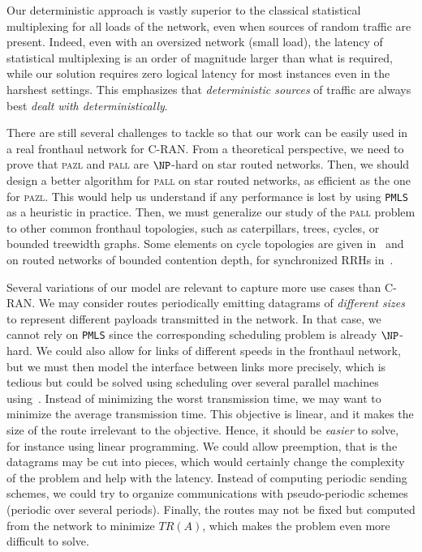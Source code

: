 \documentclass[a4paper,10pt]{journal}
\newcommand\PMLS{\texttt{PMLS}\xspace}
\newcommand\pazl{\textsc{pazl}\xspace}
\newcommand\pall{\textsc{pall}\xspace}
\begin{document}
 	Our deterministic approach is vastly superior to the classical statistical multiplexing for all loads of the network, even when sources of random traffic are present. Indeed, even with an oversized network (small load), the latency of statistical multiplexing is an order of magnitude larger than what is required, while our solution requires zero logical latency for most instances even in the harshest settings. This emphasizes that \emph{deterministic sources} of traffic are always best \emph{dealt with deterministically}.  
    
 	There are still several challenges to tackle so that our work can be easily used in a real fronthaul network for C-RAN. 
  	From a theoretical perspective, we need to prove that \pazl and \pall are $\NP$-hard on star routed networks. Then, we should design a better \FPT algorithm for \pall on star routed networks, as efficient as the one for \pazl. This would help us understand if any performance is lost by using \PMLS as a heuristic in practice. Then, we must generalize our study of the \pall problem to other common fronthaul topologies, such as caterpillars, trees, cycles, or bounded treewidth graphs. Some elements on cycle topologies are given in~\cite{DBLP:conf/ondm/BarthGS19} and on routed networks of bounded contention depth, for synchronized RRHs in~\cite{guiraud2020synchronized}.


   	Several variations of our model are relevant to capture more use cases than C-RAN. 
   	We may consider routes periodically emitting datagrams of \emph{different sizes} to represent different payloads transmitted in the network. In that case, we cannot rely on \PMLS since the corresponding scheduling problem is already $\NP$-hard. 
   	We could also allow for links of different speeds in the fronthaul network, but we must then model
   	the interface between links more precisely, which is tedious but could be solved using scheduling over several parallel machines using~\cite{simons1989fast}.
	Instead of minimizing the worst transmission time, we may want to minimize the average transmission time. This objective is linear, and it makes the size of the route irrelevant to the objective. Hence, it should be \emph{easier} to solve, for instance using linear programming. We could allow preemption, that is the datagrams may be cut into pieces, which would certainly change the complexity of the problem and help with the latency.  
   	Instead of computing periodic sending schemes, we could try to organize communications with pseudo-periodic schemes (periodic over several periods). Finally, the routes may not be fixed but computed from the network to minimize $TR(A)$, which makes the problem even more difficult to solve. 
\end{document}
